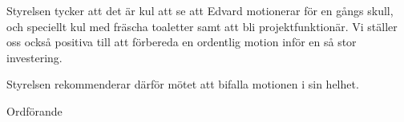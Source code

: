 \documentclass[../_main/handlingar.tex]{subfiles}
\begin{document}
\motionssvar

Styrelsen tycker att det är kul att se att Edvard motionerar för en gångs skull, och speciellt kul med fräscha toaletter samt att bli projektfunktionär. Vi ställer oss också positiva till att förbereda en ordentlig motion inför en så stor investering.  

Styrelsen rekommenderar därför mötet att bifalla motionen i sin helhet.


\begin{signatures}{1}
    \ist
    \signature{\ordf}{Ordförande}
\end{signatures}
\end{document}
